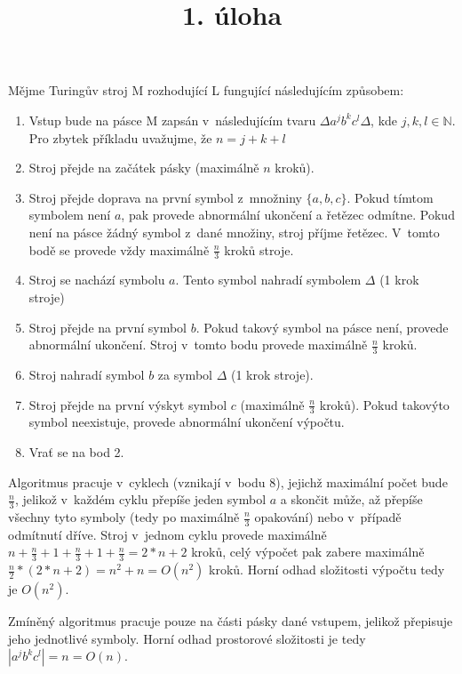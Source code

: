 \documentclass[a4paper]{article}
\title {1. úloha}
\begin{document}
\section*{}
Mějme Turingův stroj M rozhodující L fungující následujícím způsobem:
\begin{enumerate}
    \item Vstup bude na pásce M zapsán v~následujícím tvaru $\Delta a^j b^k c^l\Delta$, kde $j,k,l \in \mathbb{N}$.
    Pro zbytek příkladu uvažujme, že $n=j+k+l$
    \item Stroj přejde na začátek pásky (maximálně $n$ kroků).
    \item Stroj přejde doprava na první symbol z~množniny $\{a,b,c\}$.
    Pokud tímtom symbolem není $a$, pak provede abnormální ukončení a řetězec odmítne.
    Pokud není na pásce žádný symbol z~dané množiny, stroj příjme řetězec.
    V~tomto bodě se provede vždy maximálně $\frac{n}{3}$ kroků stroje.
    \item Stroj se nachází symbolu $a$. Tento symbol nahradí symbolem $\Delta$ (1 krok stroje)
    \item Stroj přejde na první symbol $b$.
    Pokud takový symbol na pásce není, provede abnormální ukončení.
    Stroj v~tomto bodu provede maximálně $\frac{n}{3}$ kroků.
    \item Stroj nahradí symbol $b$ za symbol $\Delta$ (1 krok stroje).
    \item Stroj přejde na první výskyt symbol $c$ (maximálně $\frac{n}{3}$ kroků).
    Pokud takovýto symbol neexistuje, provede abnormální ukončení výpočtu.
    \item Vrať se na bod 2.
\end{enumerate}
Algoritmus pracuje v~cyklech (vznikají v~bodu 8),
jejichž maximální počet bude $\frac{n}{3}$, jelikož v~každém cyklu přepíše jeden symbol $a$ a skončit může, až přepíše
všechny tyto symboly (tedy po maximálně $\frac{n}{3}$ opakování) nebo v~případě odmítnutí dříve.
Stroj v~jednom cyklu provede maximálně $n+\frac{n}{3}+1+\frac{n}{3}+1+\frac{n}{3}=2*n+2$ kroků, celý výpočet pak zabere
maximálně $\frac{n}{2}*(2*n+2)=n^2+n=O(n^2)$ kroků. Horní odhad složitosti výpočtu tedy je $O(n^2)$.

Zmíněný algoritmus pracuje pouze na části pásky dané vstupem, jelikož přepisuje jeho jednotlivé symboly.
Horní odhad prostorové složitosti je tedy $|a^j b^k c^l|=n=O(n)$. 
\end{document}
